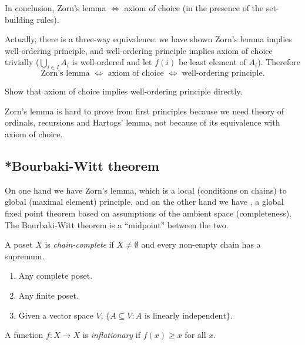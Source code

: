 \documentclass[a4paper]{article}
\begin{document}
In conclusion, Zorn's lemma \(\Leftrightarrow\) axiom of choice (in the presence of the set-building rules).

Actually, there is a three-way equivalence: we have shown Zorn's lemma implies well-ordering principle, and well-ordering principle implies axiom of choice trivially (\(\bigcup_{i \in I} A_i\) is well-ordered and let \(f(i)\) be least element of \(A_i\)). Therefore
\[
  \text{Zorn's lemma } \Leftrightarrow \text{ axiom of choice } \Leftrightarrow \text{ well-ordering principle}.
\]

\begin{ex}
  Show that axiom of choice implies well-ordering principle directly.
\end{ex}

\begin{note}
  Zorn's lemma is hard to prove from first principles because we need theory of ordinals, recursions and Hartogs' lemma, not because of its equivalence with axiom of choice.
\end{note}

\subsection{*Bourbaki-Witt theorem}

On one hand we have Zorn's lemma, which is a local (conditions on chains) to global (maximal element) principle, and on the other hand we have , a global fixed point theorem based on assumptions of the ambient space (completeness). The Bourbaki-Witt theorem is a ``midpoint'' between the two.

\begin{definition}
  A poset \(X\) is \emph{chain-complete} if \(X \neq \emptyset\) and every non-empty chain has a supremum.
\end{definition}

\begin{eg}\leavevmode
  \begin{enumerate}
  \item Any complete poset.
  \item Any finite poset.
  \item Given a vector space \(V\), \(\{A \subseteq V: A \text{ is linearly independent}\}\).
  \end{enumerate}
\end{eg}

\begin{definition}[Inflationary]
  A function \(f: X \to X\) is \emph{inflationary} if \(f(x) \geq x\) for all \(x\).
\end{definition}
\end{document}
